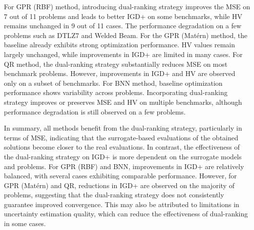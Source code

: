 \documentclass{article}
\begin{document}
For GPR (RBF) method, introducing dual-ranking strategy improves the MSE on 7 out of 11 problems and leads to better IGD+ on some benchmarks, while HV remains unchanged in 9 out of 11 cases. The performance degradation on a few problems such as DTLZ7 and Welded Beam. For the GPR (Matérn) method, the baseline already exhibits strong optimization performance. HV values remain largely unchanged, while improvements in IGD+ are limited in many cases. For QR method, the dual-ranking strategy substantially reduces MSE on most benchmark problems. However, improvements in IGD+ and HV are observed only on a subset of benchmarks. For BNN method, baseline optimization performance shows variability across problems. Incorporating dual-ranking strategy improves or preserves MSE and HV on multiple benchmarks, although performance degradation is still observed on a few problems. 

In summary, all methods benefit from the dual-ranking strategy, particularly in terms of MSE, indicating that the surrogate-based evaluations of the obtained solutions become closer to the real evaluations. In contrast, the effectiveness of the dual-ranking strategy on IGD+ is more dependent on the surrogate models and problems. For GPR (RBF) and BNN, improvements in IGD+ are relatively balanced, with several cases exhibiting comparable performance. However, for GPR (Matérn) and QR, reductions in IGD+ are observed on the majority of problems, suggesting that the dual-ranking strategy does not consistently guarantee improved convergence. This may also be attributed to limitations in uncertainty estimation quality, which can reduce the effectiveness of dual-ranking in some cases.
\end{document}
